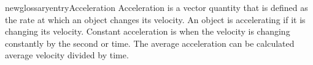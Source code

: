 newglossaryentry{Acceleration }
   {
    Acceleration is a vector quantity that is defined as the rate at which an object changes its velocity. An object is accelerating if it is changing its velocity. Constant acceleration is when the velocity is changing constantly by the second or time. The average acceleration can be calculated average velocity divided by time. }
